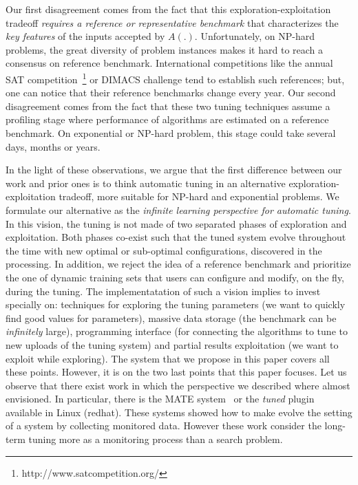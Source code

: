 \documentclass[10pt, conference, compsocconf]{IEEEtran}
\begin{document}
Our first disagreement comes from the fact that this exploration-exploitation tradeoff {\it requires a reference or representative 
benchmark} that characterizes the {\it key features} of the inputs accepted by  $A(.)$. Unfortunately, on NP-hard problems, the great 
diversity of problem instances makes it hard to reach a consensus on reference benchmark. International competitions like the annual SAT 
competition~\footnote{http://www.satcompetition.org/} or DIMACS challenge tend to establish such references; but, one can notice 
that their reference benchmarks change every year. 
Our second disagreement comes from the fact that these two tuning techniques assume a profiling stage where performance of 
algorithms are estimated on a reference benchmark. On exponential or NP-hard problem, this stage could take several days, 
months or years. 


In the light of these observations, we argue that the first difference between our work and prior ones is to think 
automatic tuning in an alternative exploration-exploitation tradeoff, more suitable for NP-hard and exponential problems. 
We formulate our alternative as the {\it infinite learning perspective for automatic tuning}. 
In this vision, the tuning is not made of two separated phases of exploration and exploitation. Both phases co-exist 
such that the tuned system evolve throughout the time with new optimal or sub-optimal configurations, discovered in the processing. 
In addition, we reject the idea of a reference benchmark and prioritize the one of dynamic training sets that users 
can configure and modify, on the fly, during the tuning. 
 The implementatation of such a vision implies to invest specially on: 
techniques for exploring the tuning parameters (we want to quickly find good values for parameters), massive data storage (the benchmark 
can be {\it infinitely} large), programming interface (for connecting the algorithms to tune to new uploads of the tuning system) and partial results exploitation (we want to exploit while exploring). The system that we propose in this paper covers all these points. However, it is on the two last points that this paper focuses. 
Let us observe that there exist work in which the perspective we described where almost envisioned. In particular, 
there is the MATE system~\cite{DBLP:conf/para/MorajkoMCMS10} or the {\it tuned} plugin available in Linux (redhat). These systems 
showed how to make evolve the setting of a system by collecting monitored data. However these work consider the long-term tuning more
 as a monitoring process than a search problem.
\end{document}
